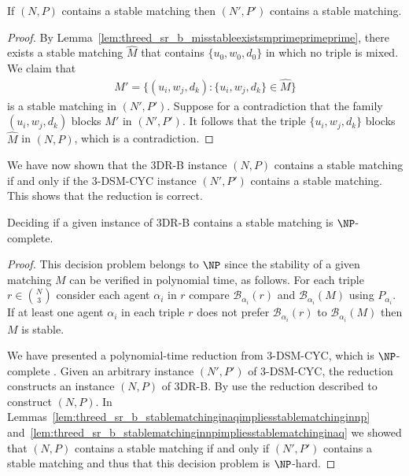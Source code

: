 \begin{lem}
\label{lem:threed_sr_b_stablematchinginnpimpliesstablematchinginaq}
If $(N, P)$ contains a stable matching then $(N', P')$ contains a stable matching.
\end{lem}
\begin{proof}

By Lemma~\ref{lem:threed_sr_b_misstableexistsmprimeprimeprime}, there exists a stable matching $\hat{M}$ that contains $\{ u_0, w_0, d_0 \}$ in which no triple is mixed. We claim that
\begin{align*}
    M' = \{ ( u_i, w_j, d_k ) : \{ u_i, w_j, d_k \} \in \hat{M} \}
\end{align*}
is a stable matching in $(N', P')$. Suppose for a contradiction that the family $( u_i, w_j, d_k )$ blocks $M'$ in $(N', P')$. It follows that the triple $\{ u_i, w_j, d_k \}$ blocks $\hat{M}$ in $(N, P)$, which is a contradiction.
\end{proof}


We have now shown that the 3DR-B instance $(N, P)$ contains a stable matching if and only if the 3-DSM-CYC instance $(N', P')$ contains a stable matching. This shows that the reduction is correct.

\begin{thm}
\label{thm:threed_sr_b_existence}
Deciding if a given instance of 3DR-B contains a stable matching is $\NP$-complete.
\end{thm}
\begin{proof}
This decision problem belongs to $\NP$ since the stability of a given matching $M$ can be verified in polynomial time, as follows. For each triple $r \in \binom{N}{3}$ consider each agent $\alpha_i$ in $r$ compare $\mathscr{B}_{\alpha_i}(r)$ and $\mathscr{B}_{\alpha_i}(M)$ using $P_{\alpha_i}$. If at least one agent $\alpha_i$ in each triple $r$ does not prefer $\mathscr{B}_{\alpha_i}(r)$ to  $\mathscr{B}_{\alpha_i}(M)$ then $M$ is stable.

We have presented a polynomial-time reduction from 3-DSM-CYC, which is $\NP$-complete \cite{Plaxton3DSMCYCJournal}. Given an arbitrary instance $(N', P')$ of 3-DSM-CYC, the reduction constructs an instance $(N, P)$ of 3DR-B. By use the reduction described to construct $(N, P)$. In Lemmas~\ref{lem:threed_sr_b_stablematchinginaqimpliesstablematchinginnp} and~\ref{lem:threed_sr_b_stablematchinginnpimpliesstablematchinginaq} we showed that $(N, P)$ contains a stable matching if and only if $(N', P')$ contains a stable matching and thus that this decision problem is $\NP$-hard.
\end{proof}